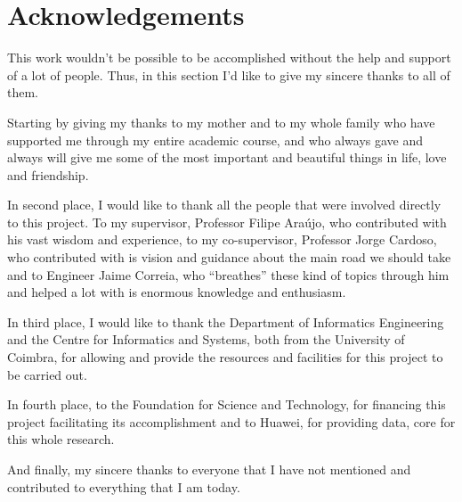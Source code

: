 
\section*{Acknowledgements}
\label{sec:acknowledgements}


This work wouldn't be possible to be accomplished without the help and support of a lot of people. Thus, in this section I'd like to give my sincere thanks to all of them.

Starting by giving my thanks to my mother and to my whole family who have supported me through my entire academic course, and who always gave and always will give me some of the most important and beautiful things in life, love and friendship.

In second place, I would like to thank all the people that were involved directly to this project. To my supervisor, Professor Filipe Araújo, who contributed with his vast wisdom and experience, to my co-supervisor, Professor Jorge Cardoso, who contributed with is vision and guidance about the main road we should take and to Engineer Jaime Correia, who ``breathes'' these kind of topics through him and helped a lot with is enormous knowledge and enthusiasm.

In third place, I would like to thank the Department of Informatics Engineering and the Centre for Informatics and Systems, both from the University of Coimbra, for allowing and provide the resources and facilities for this project to be carried out.

In fourth place, to the Foundation for Science and Technology, for financing this project facilitating its accomplishment and to Huawei, for providing data, core for this whole research.

And finally, my sincere thanks to everyone that I have not mentioned and contributed to everything that I am today.


\restoregeometry